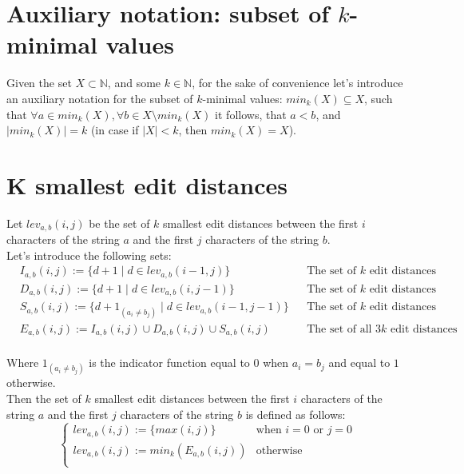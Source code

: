 \documentclass[fleqn,leqno]{article}
\begin{document}
\setlength{\parindent}{0pt}

\section*{Auxiliary notation: subset of $k$-minimal values}

Given the set $X \subset \mathbb{N}$, and some $k \in \mathbb{N}$, for the sake of convenience let's introduce an auxiliary notation for the subset of $k$-minimal values: $min_k(X) \subseteq X$, such that $\forall a \in min_k(X), \forall b \in X \setminus min_k(X)$ it follows, that $a < b$, and $|min_k(X)|=k$ (in case if $|X| < k$, then $min_k(X) = X$).

\section*{K smallest edit distances}

Let $lev_{a,b}(i, j)$ be the set of $k$ smallest edit distances between the first $i$ characters of the string $a$ and the first $j$ characters of the string $b$. \\

Let's introduce the following sets:
\begin{equation}
\begin{split}
	      & I_{a,b}(i, j) := \{ d + 1 \mid d \in lev_{a,b}(i - 1, j) \}  && \text{The set of $k$ edit distances obtained through insertions} \\
	      & D_{a,b}(i, j) := \{ d + 1 \mid d \in lev_{a,b}(i, j - 1) \} && \text{The set of $k$ edit distances obtained through deletions} \\
	      & S_{a,b}(i, j) := \{ d + 1_{(a_i \neq b_j)} \mid d \in lev_{a,b}(i - 1, j - 1) \} && \text{The set of $k$ edit distances obtained through substitutions} \\ 
	      & E_{a,b}(i, j) := I_{a,b}(i, j) \cup D_{a,b}(i, j) \cup S_{a,b}(i, j) && \text{The set of all $3k$ edit distances}  \\
\end{split}
\end{equation}

Where $1_{(a_i \neq b_j)}$ is the indicator function equal to $0$ when $a_{i}=b_{j}$ and equal to $1$ otherwise. \\

Then the set of $k$ smallest edit distances between the first $i$ characters of the string $a$ and the first $j$ characters of the string $b$ is defined as follows:
\begin{equation}
\begin{cases}
	lev_{a,b}(i, j) := \{ max(i, j) \}  		& \text{when $i = 0$ or $j = 0$} \\
	lev_{a,b}(i, j) := min_k(E_{a,b}(i, j)) 	& \text{otherwise} \\
\end{cases}
\end{equation}
\end{document}
